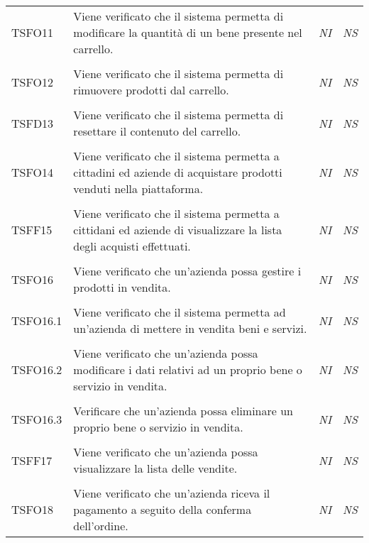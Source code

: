 \begin{longtable}{ >{\centering}p{} >{}p{}
			>{\centering}p{} >{\centering}p{}}
		\tabularnewline
		\hypertarget{TSFO11}{TSFO11} & Viene verificato che il sistema permetta di 
		modificare la quantità di un bene presente nel carrello. & 
		\textit{NI} & \textit{NS}\\ 

		\tabularnewline
		\hypertarget{TSFO12}{TSFO12} & Viene verificato che il sistema permetta di 
		rimuovere prodotti dal carrello. & \textit{NI} & \textit{NS}\\ 

		\tabularnewline
		\hypertarget{TSFD13}{TSFD13} & Viene verificato che il sistema permetta di 
		resettare il contenuto del carrello. & \textit{NI} & \textit{NS}\\ 

		\tabularnewline
		\hypertarget{TSFO14}{TSFO14} & Viene verificato che il sistema permetta a 
		cittadini ed aziende di acquistare prodotti venduti nella piattaforma. & 
		\textit{NI} & \textit{NS}\\ 

		\tabularnewline
		\hypertarget{TSFF15}{TSFF15} & Viene verificato che il sistema permetta a 
		cittidani ed aziende di visualizzare la lista degli acquisti effettuati. & 
		\textit{NI} & \textit{NS}\\ 

		\tabularnewline
		\hypertarget{TSFO16}{TSFO16} & Viene verificato che un'azienda possa gestire i 
		prodotti in vendita. & \textit{NI} & \textit{NS}\\ 

		\tabularnewline
		\hypertarget{TSFO16.1}{TSFO16.1} & Viene verificato che il sistema permetta ad 
		un'azienda di mettere in vendita beni e servizi. & \textit{NI} & \textit{NS}\\ 

		\tabularnewline
		\hypertarget{TSFO16.2}{TSFO16.2} & Viene verificato che un'azienda possa 
		modificare i dati relativi ad un proprio bene o servizio in vendita. & 
		\textit{NI} & \textit{NS}\\ 

		\tabularnewline
		\hypertarget{TSFO16.3}{TSFO16.3} & Verificare che un'azienda possa eliminare un 
		proprio bene o servizio in vendita. & \textit{NI} & \textit{NS}\\ 

		\tabularnewline
		\hypertarget{TSFF17}{TSFF17} & Viene verificato che un'azienda possa 
		visualizzare la lista delle vendite. & \textit{NI} & \textit{NS}\\ 

		\tabularnewline
		\hypertarget{TSFO18}{TSFO18} & Viene verificato che un'azienda riceva il 
		pagamento a seguito della conferma dell'ordine. & \textit{NI} & \textit{NS}\\ 


\end{longtable}
